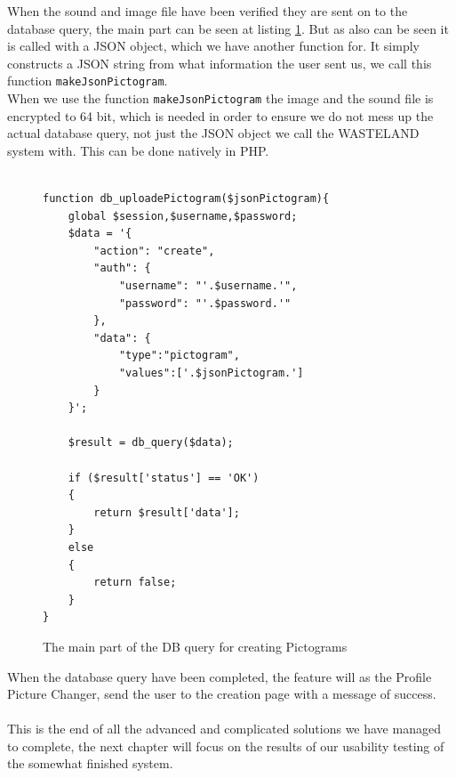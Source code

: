 
When the sound and image file have been verified they are sent on to the database query, the main part can be seen at listing \ref{lst:picsManagerMakeDbQuery}. But as also can be seen it is called with a JSON object, which we have another function for. It simply constructs a JSON string from what information the user sent us, we call this function \texttt{makeJsonPictogram}.\\
When we use the function \texttt{makeJsonPictogram} the image and the sound file is encrypted to 64 bit, which is needed in order to ensure we do not mess up the actual database query, not just the JSON object we call the WASTELAND system with. This can be done natively in PHP.\\
\\

\lstset{language=PHP}
\begin{figure}[htbp]
\begin{lstlisting}[firstline=1]
function db_uploadePictogram($jsonPictogram){
	global $session,$username,$password;
	$data = '{
		"action": "create",
		"auth": {
			"username": "'.$username.'",
			"password": "'.$password.'"
		},
	    "data": {
	    	"type":"pictogram",
	    	"values":['.$jsonPictogram.']
	    }
	}';
	
	$result = db_query($data);

	if ($result['status'] == 'OK')
	{
		return $result['data'];
	}
	else
	{
		return false;
	}
}
\end{lstlisting}
\caption{The main part of the DB query for creating Pictograms}
\label{lst:picsManagerMakeDbQuery}
\end{figure}

When the database query have been completed, the feature will as the Profile Picture Changer, send the user to the creation page with a message of success.\\
\\

This is the end of all the advanced and complicated solutions we have managed to complete, the next chapter will focus on the results of our usability testing of the somewhat finished system.